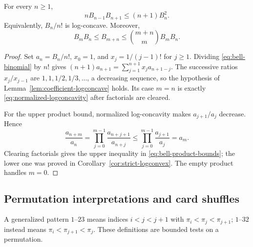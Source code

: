 \begin{theorem}\label{thm:normalized-logconcavity}
For every $n\geq1$,
\begin{equation}\label{eq:normalized-logconcavity}
 n B_{n-1}B_{n+1}\leq(n+1)B_n^2.
\end{equation}
Equivalently, $B_n/n!$ is log-concave. Moreover,
\begin{equation}\label{eq:bell-product-bounds}
 B_mB_n\leq B_{m+n}\leq\binom{m+n}{m}B_mB_n.
\end{equation}
\end{theorem}
\begin{proof}
Set $a_n=B_n/n!$, $x_0=1$, and $x_j=1/(j-1)!$ for $j\geq1$.
Dividing \eqref{eq:bell-binomial} by $n!$ gives
$(n+1)a_{n+1}=\sum_{j=1}^{n+1}x_j a_{n+1-j}$.
The successive ratios $x_j/x_{j-1}$ are
$1,1,1/2,1/3,\ldots$, a decreasing sequence, so the hypothesis of
Lemma~\ref{lem:coefficient-logconcave} holds. Its case $m=n$ is exactly
\eqref{eq:normalized-logconcavity} after factorials are cleared.

For the upper product bound, normalized log-concavity makes $a_{j+1}/a_j$
decrease. Hence
\[
 \frac{a_{n+m}}{a_n}
 =\prod_{j=0}^{m-1}\frac{a_{n+j+1}}{a_{n+j}}
 \leq\prod_{j=0}^{m-1}\frac{a_{j+1}}{a_j}=a_m.
\]
Clearing factorials gives the upper inequality in
\eqref{eq:bell-product-bounds}; the lower one was proved in
Corollary~\ref{cor:strict-logconvex}. The empty product handles $m=0$.
\end{proof}

\subsection{Permutation interpretations and card shuffles}

A generalized pattern $1$--$23$ means indices $i<j<j+1$ with
$\pi_i<\pi_j<\pi_{j+1}$; $1$--$32$ instead means
$\pi_i<\pi_{j+1}<\pi_j$. These definitions are bounded tests on a permutation.


